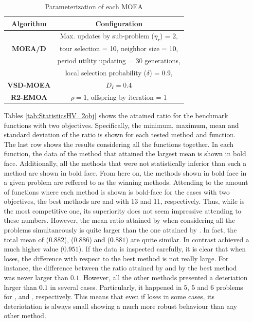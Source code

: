 %
\begin{table}[t]
\centering
\caption{Parameterization of each MOEA}
\label{tab:Parametrization}
\begin{tabular}{c|c}
\hline
\textbf{Algorithm} & \textbf{Configuration} \\ \hline
\multirow{3}{*}{\textbf{MOEA/D}} &Max. updates by sub-problem ($\eta_r$) = 2, \\
 & tour selection = 10,   neighbor size = 10, \\
 & period utility updating = 30 generations, \\ 
 & local selection probability ($\delta$) = 0.9,\\ \hline
\textbf{VSD-MOEA} & $D_I=0.4$ \\ \hline
\textbf{R2-EMOA} & $\rho=1$, offspring by iteration = $1$ \\ \hline
\end{tabular}
\end{table}







Tables \ref{tab:StatisticsHV_2obj} shows the attained \HV{} ratio for the benchmark functions
with two objectives.
%
Specifically, the minimum, maximum, mean and standard deviation of the \HV{} ratio is shown for each tested method and function.
%
The last row shows the results considering all the functions together.
%
In each function, the data of the method that attained the largest mean is shown in bold face.
%
Additionally, all the methods that were not statistically inferior than such a method are shown in bold face.
%
From here on, the methods shown in bold face in a given problem are reffered to as the winning methods.
%
Attending to the amount of functions where each method is shown is bold-face for the cases 
with two objectives, the best methods are \VSDMOEA{} and \RMOEA{} with 13 and 11, respectively.
%
Thus, while \VSDMOEA{} is the most competitive one, its superiority does not seem impressive
attending to these numbers.
%
However, the mean \HV{} ratio attained by \VSDMOEA{} when considering all the problems simultaneously is quite larger
than the one attained by \RMOEA{}.
%
In fact, the total mean of \RMOEA{} ($0.882$), \NSGAII{} ($0.886$) and \MOEAD{} ($0.881$) are quite similar.
%
In contrast \VSDMOEA{} achieved a much higher value ($0.951$).
%
If the data is inspected carefully, it is clear that when \VSDMOEA{} loses, the difference with respect to the
best method is not really large.
%
For instance, the difference between the \HV{} ratio attained by \VSDMOEA{} and by the best method was never larger
than $0.1$.
%
However, all the other methods presented a deteriation larger than $0.1$ in several cases.
%
Particularly, it happened in $5$, $5$ and $6$ problems for \RMOEA{}, \NSGAII{} and \MOEAD{}, respectively.
%
This means that even if \VSDMOEA{} loses in some cases, its deteriotation is always small showing a much more 
robust behaviour than any other method.

